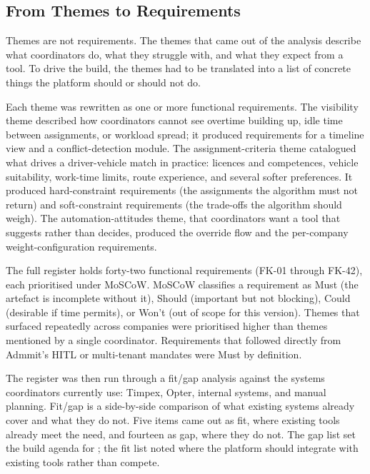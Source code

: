 \subsection{From Themes to Requirements}
\label{sec:themes-to-requirements}

Themes are not requirements. The themes that came out of the analysis describe what coordinators do, what they struggle with, and what they expect from a tool. To drive the build, the themes had to be translated into a list of concrete things the platform should or should not do.

Each theme was rewritten as one or more functional requirements. The visibility theme described how coordinators cannot see overtime building up, idle time between assignments, or workload spread; it produced requirements for a timeline view and a conflict-detection module. The assignment-criteria theme catalogued what drives a driver-vehicle match in practice: licences and competences, vehicle suitability, work-time limits, route experience, and several softer preferences. It produced hard-constraint requirements (the assignments the algorithm must not return) and soft-constraint requirements (the trade-offs the algorithm should weigh). The automation-attitudes theme, that coordinators want a tool that suggests rather than decides, produced the override flow and the per-company weight-configuration requirements.

The full register holds forty-two functional requirements (FK-01 through FK-42), each prioritised under MoSCoW. MoSCoW classifies a requirement as Must (the artefact is incomplete without it), Should (important but not blocking), Could (desirable if time permits), or Won't (out of scope for this version). Themes that surfaced repeatedly across companies were prioritised higher than themes mentioned by a single coordinator. Requirements that followed directly from Admmit's HITL or multi-tenant mandates were Must by definition.

The register was then run through a fit/gap analysis against the systems coordinators currently use: Timpex, Opter, internal systems, and manual planning. Fit/gap is a side-by-side comparison of what existing systems already cover and what they do not. Five items came out as fit, where existing tools already meet the need, and fourteen as gap, where they do not. The gap list set the build agenda for ; the fit list noted where the platform should integrate with existing tools rather than compete.

